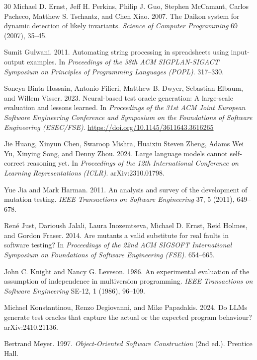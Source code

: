 \documentclass[sigconf,nonacm]{acmart}
\begin{document}
\begin{thebibliography}{30}
Michael D. Ernst, Jeff H. Perkins, Philip J. Guo, Stephen McCamant, Carlos Pacheco, Matthew S. Tschantz, and Chen Xiao. 2007.
The Daikon system for dynamic detection of likely invariants.
\textit{Science of Computer Programming} 69 (2007), 35--45.

Sumit Gulwani. 2011.
Automating string processing in spreadsheets using input-output examples.
In \textit{Proceedings of the 38th ACM SIGPLAN-SIGACT Symposium on Principles of Programming Languages (POPL)}. 317--330.

Soneya Binta Hossain, Antonio Filieri, Matthew B. Dwyer, Sebastian Elbaum, and Willem Visser. 2023.
Neural-based test oracle generation: A large-scale evaluation and lessons learned.
In \textit{Proceedings of the 31st ACM Joint European Software Engineering Conference and Symposium on the Foundations of Software Engineering (ESEC/FSE)}. \url{https://doi.org/10.1145/3611643.3616265}

Jie Huang, Xinyun Chen, Swaroop Mishra, Huaixiu Steven Zheng, Adams Wei Yu, Xinying Song, and Denny Zhou. 2024.
Large language models cannot self-correct reasoning yet.
In \textit{Proceedings of the 12th International Conference on Learning Representations (ICLR)}. arXiv:2310.01798.

Yue Jia and Mark Harman. 2011.
An analysis and survey of the development of mutation testing.
\textit{IEEE Transactions on Software Engineering} 37, 5 (2011), 649--678.

René Just, Darioush Jalali, Laura Inozemtseva, Michael D. Ernst, Reid Holmes, and Gordon Fraser. 2014.
Are mutants a valid substitute for real faults in software testing?
In \textit{Proceedings of the 22nd ACM SIGSOFT International Symposium on Foundations of Software Engineering (FSE)}. 654--665.

John C. Knight and Nancy G. Leveson. 1986.
An experimental evaluation of the assumption of independence in multiversion programming.
\textit{IEEE Transactions on Software Engineering} SE-12, 1 (1986), 96--109.

Michael Konstantinou, Renzo Degiovanni, and Mike Papadakis. 2024.
Do LLMs generate test oracles that capture the actual or the expected program behaviour?
arXiv:2410.21136.

Bertrand Meyer. 1997.
\textit{Object-Oriented Software Construction} (2nd ed.).
Prentice Hall.


\end{thebibliography}
\end{document}
